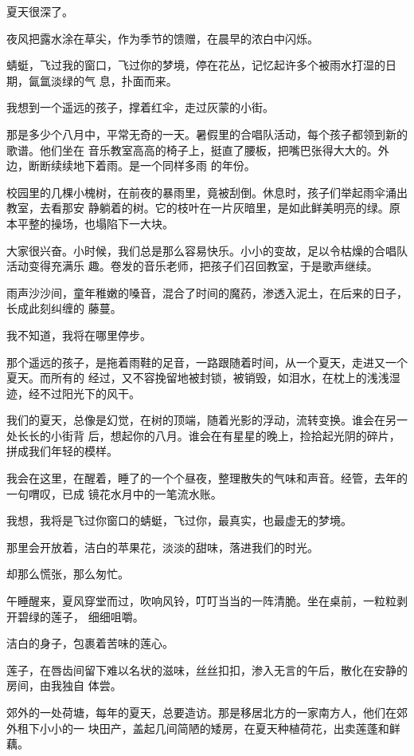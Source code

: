 \documentclass[12pt,a4paper]{article}
\begin{document}
		夏天很深了。

		夜风把露水涂在草尖，作为季节的馈赠，在晨早的浓白中闪烁。

		蜻蜓，飞过我的窗口，飞过你的梦境，停在花丛，记忆起许多个被雨水打湿的日期，氤氲淡绿的气
	息，扑面而来。

		我想到一个遥远的孩子，撑着红伞，走过灰蒙的小街。

		那是多少个八月中，平常无奇的一天。暑假里的合唱队活动，每个孩子都领到新的歌谱。他们坐在
	音乐教室高高的椅子上，挺直了腰板，把嘴巴张得大大的。外边，断断续续地下着雨。是一个同样多雨
	的年份。

		校园里的几棵小槐树，在前夜的暴雨里，竟被刮倒。休息时，孩子们举起雨伞涌出教室，去看那安
	静躺着的树。它的枝叶在一片灰暗里，是如此鲜美明亮的绿。原本平整的操场，也塌陷下一大块。

		大家很兴奋。小时候，我们总是那么容易快乐。小小的变故，足以令枯燥的合唱队活动变得充满乐
	趣。卷发的音乐老师，把孩子们召回教室，于是歌声继续。

		雨声沙沙间，童年稚嫩的嗓音，混合了时间的魔药，渗透入泥土，在后来的日子，长成此刻纠缠的
	藤蔓。

		我不知道，我将在哪里停步。

		那个遥远的孩子，是拖着雨鞋的足音，一路跟随着时间，从一个夏天，走进又一个夏天。而所有的
	经过，又不容挽留地被封锁，被销毁，如泪水，在枕上的浅浅湿迹，经不过阳光下的风干。

		我们的夏天，总像是幻觉，在树的顶端，随着光影的浮动，流转变换。谁会在另一处长长的小街背
	后，想起你的八月。谁会在有星星的晚上，捡拾起光阴的碎片，拼成我们年轻的模样。

		我会在这里，在醒着，睡了的一个个昼夜，整理散失的气味和声音。经管，去年的一句喟叹，已成
	镜花水月中的一笔流水账。

		我想，我将是飞过你窗口的蜻蜓，飞过你，最真实，也最虚无的梦境。

		那里会开放着，洁白的苹果花，淡淡的甜味，落进我们的时光。

		却那么慌张，那么匆忙。

	\endwriting



		午睡醒来，夏风穿堂而过，吹响风铃，叮叮当当的一阵清脆。坐在桌前，一粒粒剥开碧绿的莲子，
	细细咀嚼。

		洁白的身子，包裹着苦味的莲心。

		莲子，在唇齿间留下难以名状的滋味，丝丝扣扣，渗入无言的午后，散化在安静的房间，由我独自
	体尝。

		郊外的一处荷塘，每年的夏天，总要造访。那是移居北方的一家南方人，他们在郊外租下小小的一
	块田产，盖起几间简陋的矮房，在夏天种植荷花，出卖莲蓬和鲜藕。
\end{document}
